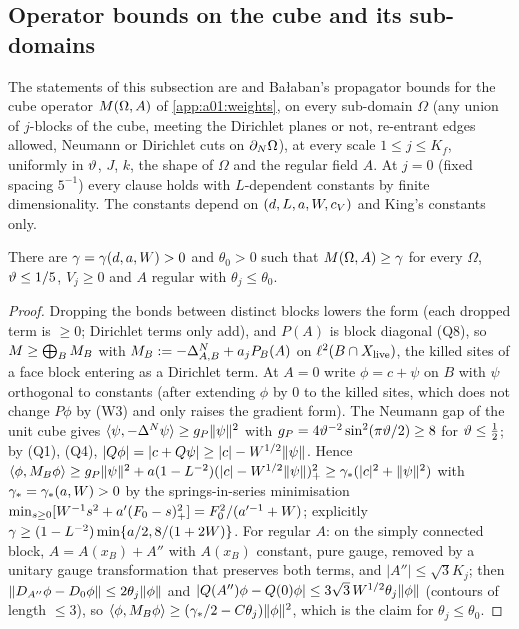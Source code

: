 \subsection{Operator bounds on the cube and its sub-domains}\label{app:a01:ops}

The statements of this subsection are \cite[Thm.~3.3]{K1} and Ba{\l}aban's propagator bounds \cite[Sects.~1--2]{Ba4} for the cube operator $M(\Omega,A)$ of \cref{app:a01:weights}, on every sub-domain $\Omega$ (any union of $j$-blocks of the cube, meeting the Dirichlet planes or not, re-entrant edges allowed, Neumann or Dirichlet cuts on $\partial_{N}\Omega$), at every scale $1\le j\le K_f$, uniformly in $\vartheta$, $J$, $k$, the shape of $\Omega$ and the regular field $A$. At $j=0$ (fixed spacing $5^{-1}$) every clause holds with $L$-dependent constants by finite dimensionality. The constants depend on $(d,L,a,W,c_V)$ and King's constants only.

\begin{lemma}[coercivity]\label{lem:a01:A1}
There are $\gamma=\gamma(d,a,W)>0$ and $\theta_0>0$ such that $M(\Omega,A)\ge\gamma$ for every $\Omega$, $\vartheta\le1/5$, $V_j\ge0$ and $A$ regular with $\theta_j\le\theta_0$.
\end{lemma}
\begin{proof}
Dropping the bonds between distinct blocks lowers the form (each dropped term is $\ge0$; Dirichlet terms only add), and $P(A)$ is block diagonal (Q8), so $M\ge\bigoplus_BM_B$ with $M_B:=-\Delta^N_{A,B}+a_jP_B(A)$ on $\ell^2(B\cap X_{\mathrm{live}})$, the killed sites of a face block entering as a Dirichlet term. At $A=0$ write $\phi=c+\psi$ on $B$ with $\psi$ orthogonal to constants (after extending $\phi$ by $0$ to the killed sites, which does not change $P\phi$ by (W3) and only raises the gradient form). The Neumann gap of the unit cube gives $\langle \psi,-\Delta^N\psi\rangle\ge g_P\lVert \psi\rVert^2$ with $g_P=4\vartheta^{-2}\sin^2(\pi\vartheta/2)\ge8$ for $\vartheta\le\frac12$; by (Q1), (Q4), $|Q\phi|=|c+Q\psi|\ge|c|-W^{1/2}\lVert \psi\rVert$. Hence $\langle \phi,M_B\phi\rangle\ge g_P\lVert \psi\rVert^2+a(1-L^{-2})(|c|-W^{1/2}\lVert \psi\rVert)_+^2\ge\gamma_*(|c|^2+\lVert \psi\rVert^2)$ with $\gamma_*=\gamma_*(a,W)>0$ by the springs-in-series minimisation $\min_{s\ge0}[W^{-1}s^2+a'(F_0-s)_+^2]=F_0^2/(a'^{-1}+W)$; explicitly $\gamma\ge(1-L^{-2})\min\{a/2,8/(1+2W)\}$. For regular $A$: on the simply connected block, $A=A(x_B)+A''$ with $A(x_B)$ constant, pure gauge, removed by a unitary gauge transformation that preserves both terms, and $|A''|\le\sqrt3K_j$; then $\lVert D_{A''}\phi-D_0\phi\rVert\le2\theta_j\lVert \phi\rVert$ and $|Q(A'')\phi-Q(0)\phi|\le3\sqrt3\,W^{1/2}\theta_j\lVert \phi\rVert$ (contours of length $\le3$), so $\langle \phi,M_B\phi\rangle\ge(\gamma_*/2-C\theta_j)\lVert \phi\rVert^2$, which is the claim for $\theta_j\le\theta_0$.
\end{proof}

